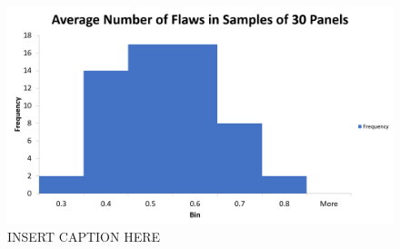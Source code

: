 \documentclass[letterpaper]{article}
\begin{document}
\begin{figure}[H]
 \centering
 \includegraphics[width=\textwidth]{q5.png}
 \caption{INSERT CAPTION HERE}
 \label{5a}
\end{figure}

\subsection{}%
\end{document}

